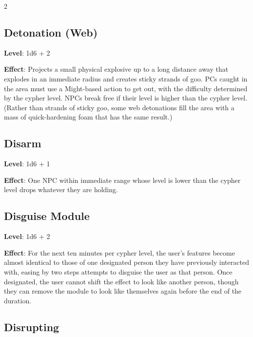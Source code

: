 \begin{multicols}{2}

\subsection{Detonation (Web)}

\textbf{Level}: 1d6 + 2

\textbf{Effect}: Projects a small physical explosive up to a long distance away that explodes in an immediate radius and creates sticky strands of goo. PCs caught in the area must use a Might-based action to get out, with the difficulty determined by the cypher level. NPCs break free if their level is higher than the cypher level.
(Rather than strands of sticky goo, some web detonations fill the area with a mass of quick-hardening foam that has the same result.)

\subsection{Disarm}

\textbf{Level}: 1d6 + 1

\textbf{Effect}: One NPC within immediate range whose level is lower than the cypher level drops whatever they are holding.

\subsection{Disguise Module}

\textbf{Level}: 1d6 + 2

\textbf{Effect}: For the next ten minutes per cypher level, the user’s features become almost identical to those of one designated person they have previously interacted with, easing by two steps attempts to disguise the user as that person. Once designated, the user cannot shift the effect to look like another person, though they can remove the module to look like themselves again before the end of the duration.

\subsection{Disrupting}


\end{multicols}
